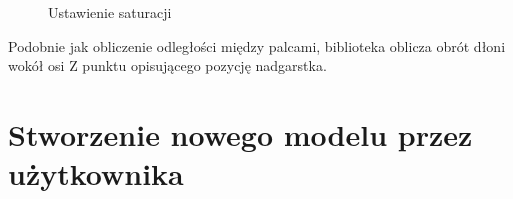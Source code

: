 \begin{figure}[H]
    \centering
    \hfill
    \caption{Ustawienie saturacji}
\end{figure}


\quad Podobnie jak obliczenie odległości między palcami, biblioteka oblicza obrót dłoni wokół osi Z punktu opisującego pozycję nadgarstka.


\section{Stworzenie nowego modelu przez użytkownika}